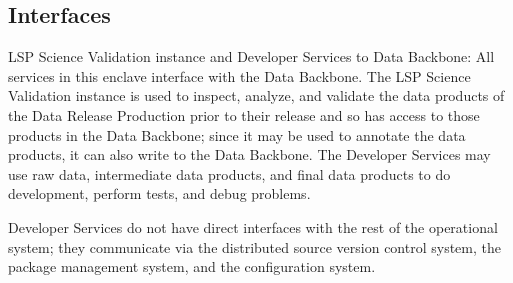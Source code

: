 \documentclass[DM,toc,lsstdraft]{lsstdoc}
\begin{document}
\subsection{Interfaces}\label{ncsa-development-integration-interfaces}

LSP Science Validation instance and Developer Services to Data Backbone:
All services in this enclave interface with the Data Backbone.  The LSP
Science Validation instance is used to inspect, analyze, and validate the data
products of the Data Release Production prior to their release and so has
access to those products in the Data Backbone; since it may be used to annotate
the data products, it can also write to the Data Backbone.  The Developer
Services may use raw data, intermediate data products, and final
data products to do development, perform tests, and debug problems.

Developer Services do not have direct interfaces with the rest of the
operational system; they communicate via the distributed source version control
system, the package management system, and the configuration system.







\end{document}
